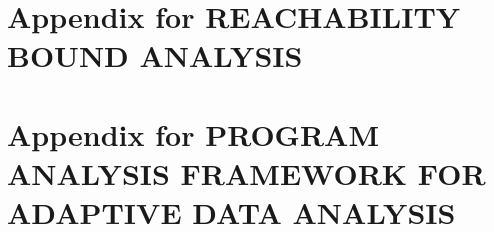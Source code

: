 \documentclass[12pt, letterpaper]{report}   %
\begin{document}


\chapter*{}
\appendix
\begingroup
  \hypersetup{linkbordercolor=white,linkcolor=black,
    filecolor=black, urlcolor=black} 
\listofappendixfigures
\endgroup
%
\chapter{Appendix for REACHABILITY BOUND ANALYSIS}
\label{apdx:reachability}


\chapter{Appendix for PROGRAM ANALYSIS FRAMEWORK FOR ADAPTIVE DATA ANALYSIS}
\label{apdx:adapt}


\end{document}
